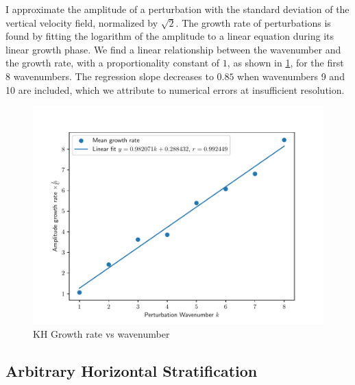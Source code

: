 \documentclass[10pt]{article}
\begin{document}
I approximate the amplitude of a perturbation with the standard deviation of the vertical velocity field, normalized by $\sqrt{2}$. The growth rate of perturbations is found by fitting the logarithm of the amplitude  to a linear equation during its linear growth phase. We find a linear relationship between the wavenumber and the growth rate, with a proportionality constant of $1$, as shown in \ref{fig:1}, for the first 8 wavenumbers. The regression slope decreases to $0.85$ when wavenumbers 9 and 10 are included, which we attribute to numerical errors at insufficient resolution.
\begin{figure}
    \centering
    \includegraphics[width=\columnwidth]{KH1.pdf}
    \caption{KH Growth rate vs wavenumber}
    \label{fig:1}
\end{figure}

\subsection{Arbitrary Horizontal Stratification}
\end{document}
